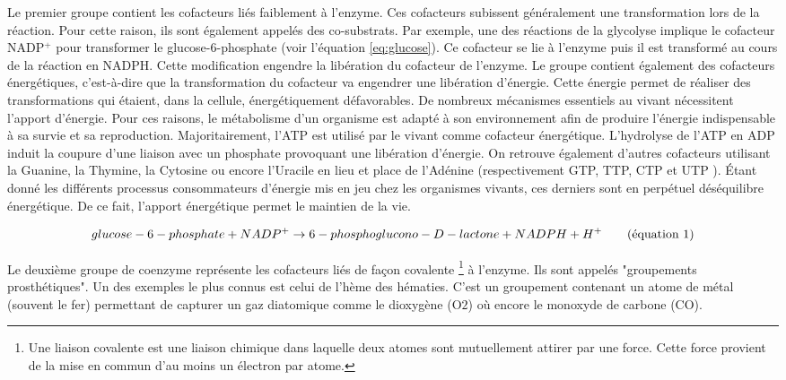 \begin{refsegment}
    Le premier groupe contient les cofacteurs liés faiblement à l'enzyme. Ces cofacteurs subissent généralement une transformation lors de la réaction. Pour cette raison, ils sont également appelés des co-substrats. Par exemple, une des réactions de la glycolyse implique le cofacteur NADP$^{+}$ pour transformer le glucose-6-phosphate (voir l'équation \ref{eq:glucose}). Ce cofacteur  se lie à l'enzyme puis il est transformé au cours de la réaction en NADPH. Cette modification engendre la libération du cofacteur de l'enzyme. Le groupe contient également des cofacteurs énergétiques, c'est-à-dire que la transformation du cofacteur va engendrer une libération d'énergie. Cette énergie permet de réaliser des transformations qui étaient, dans la cellule, énergétiquement défavorables. De nombreux mécanismes essentiels au vivant nécessitent l'apport d'énergie. Pour ces raisons, le métabolisme d'un organisme est adapté à son environnement afin de produire l'énergie indispensable à sa survie et sa reproduction. Majoritairement, l'\acrfull{ATP} est utilisé par le vivant comme cofacteur énergétique. L'hydrolyse de l'\acrfull{ATP} en \acrfull{ADP} induit la coupure d'une liaison avec un phosphate provoquant une libération d'énergie. On retrouve également d'autres cofacteurs utilisant la Guanine, la Thymine, la Cytosine ou encore l'Uracile en lieu et place de l'Adénine (respectivement  GTP, TTP, CTP et UTP ). Étant donné les différents processus consommateurs d’énergie mis en jeu chez les organismes vivants, ces derniers sont en perpétuel déséquilibre énergétique. De ce fait, l'apport énergétique permet le maintien de la vie.
    
    \begin{equation}\label{eq:glucose}
        glucose-6-phosphate + NADP^{+} \rightarrow 6-phosphoglucono-D-lactone + NADPH + H^{+}
        \stepcounter{equation}\tag{équation \theequation}
    \end{equation}
    
    Le deuxième groupe de coenzyme représente les cofacteurs liés de façon covalente \footnote{Une liaison covalente est une liaison chimique dans laquelle deux atomes sont mutuellement attirer par une force. Cette force provient de la mise en commun d'au moins un électron par atome.} à l'enzyme. Ils sont appelés "groupements prosthétiques". Un des exemples le plus connus est celui de l'hème des hématies. C'est un groupement contenant un atome de métal (souvent le fer) permettant de capturer un gaz diatomique comme le dioxygène (O${2}$) où encore le monoxyde de carbone (CO).
    

\end{refsegment}
